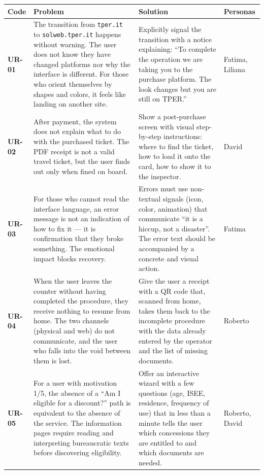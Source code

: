 ﻿\documentclass[11pt,a4paper]{article}
\begin{document}
\begin{tcolorbox}[base]
{\small
\renewcommand{\arraystretch}{1.3}
\begin{tabular}{|p{1.2cm}|p{5cm}|p{5cm}|p{2.8cm}|}
\hline
\textbf{Code} & \textbf{Problem} & \textbf{Solution} & \textbf{Personas} \\
\hline
\textbf{UR-01} & The transition from \texttt{tper.it} to
\texttt{solweb.tper.it} happens without warning. The user does not know they have
changed platforms nor why the interface is different. For those who
orient themselves by shapes and colors, it feels like landing on another site. &
Explicitly signal the transition with a notice explaining: ``To
complete the operation we are taking you to the purchase
platform. The look changes but you are still on TPER.'' & Fatima, Liliana \\
\hline
\textbf{UR-02} & After payment, the system does not explain what to do with
the purchased ticket. The PDF receipt is not a valid travel ticket,
but the user finds out only when fined on board. & Show a
post-purchase screen with visual step-by-step instructions: where to find
the ticket, how to load it onto the card, how to show it to the inspector.
& David \\
\hline
\textbf{UR-03} & For those who cannot read the interface language, an
error message is not an indication of how to fix it --- it is
confirmation that they broke something. The emotional impact blocks recovery. &
Errors must use non-textual signals (icon, color,
animation) that communicate ``it is a hiccup, not a disaster''. The
error text should be accompanied by a concrete and visual action. &
Fatima \\
\hline
\textbf{UR-04} & When the user leaves the counter without having
completed the procedure, they receive nothing to resume from home. The two
channels (physical and web) do not communicate, and the user who falls into the void between
them is lost. & Give the user a receipt with a QR
code that, scanned from home, takes them back to the incomplete procedure with the
data already entered by the operator and the list of missing documents. &
Roberto \\
\hline
\textbf{UR-05} & For a user with motivation 1/5, the absence of a
``Am I eligible for a discount?'' path is equivalent to the absence of the
service. The information pages require reading and interpreting
bureaucratic texts before discovering eligibility. & Offer an
interactive wizard with a few questions (age, ISEE, residence, frequency
of use) that in less than a minute tells the user which concessions
they are entitled to and which documents are needed. & Roberto, David \\
\hline
\end{tabular}}
\end{tcolorbox}
\end{document}
